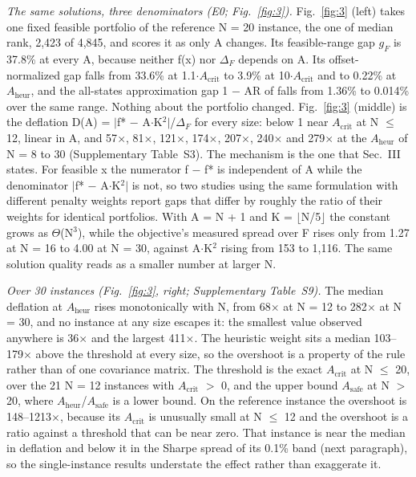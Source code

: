 \documentclass{ieeeaccess}
\begin{document}
\textit{The same solutions, three denominators (E0; Fig.~\ref{fig:3}).} Fig.~\ref{fig:3} (left) takes one fixed feasible portfolio of the reference N = 20 instance, the one of median rank, 2,423 of 4,845, and scores it as only A changes. Its feasible-range gap $g_{F}$ is 37.8\% at every A, because neither f(x) nor $\Delta_{F}$ depends on A. Its offset-normalized gap falls from 33.6\% at 1.1$\cdot$$A_{\mathrm{crit}}$ to 3.9\% at 10$\cdot$$A_{\mathrm{crit}}$ and to 0.22\% at $A_{\mathrm{heur}}$, and the all-states approximation gap 1 $-$ AR of \cite{ref22} falls from 1.36\% to 0.014\% over the same range. Nothing about the portfolio changed. Fig.~\ref{fig:3} (middle) is the deflation D(A) = $|$f* $-$ A$\cdot$K$^{2}$$|$/$\Delta_{F}$ for every size: below 1 near $A_{\mathrm{crit}}$ at N $\leq$ 12, linear in A, and 57$\times$, 81$\times$, 121$\times$, 174$\times$, 207$\times$, 240$\times$ and 279$\times$ at the $A_{\mathrm{heur}}$ of N = 8 to 30 (Supplementary Table~S3). The mechanism is the one that Sec.~III states. For feasible x the numerator f $-$ f* is independent of A while the denominator $|$f* $-$ A$\cdot$K$^{2}$$|$ is not, so two studies using the same formulation with different penalty weights report gaps that differ by roughly the ratio of their weights for identical portfolios. With A = N + 1 and K = $\lfloor$N/5$\rfloor$ the constant grows as $\Theta$(N$^{3}$), while the objective's measured spread over F rises only from 1.27 at N = 16 to 4.00 at N = 30, against A$\cdot$K$^{2}$ rising from 153 to 1,116. The same solution quality reads as a smaller number at larger N.


\textit{Over 30 instances (Fig.~\ref{fig:3}, right; Supplementary Table~S9).} The median deflation at $A_{\mathrm{heur}}$ rises monotonically with N, from 68$\times$ at N = 12 to 282$\times$ at N = 30, and no instance at any size escapes it: the smallest value observed anywhere is 36$\times$ and the largest 411$\times$. The heuristic weight sits a median 103--179$\times$ above the threshold at every size, so the overshoot is a property of the rule rather than of one covariance matrix. The threshold is the exact $A_{\mathrm{crit}}$ at N $\leq$ 20, over the 21 N = 12 instances with $A_{\mathrm{crit}}$ $>$ 0, and the upper bound $A_{\mathrm{safe}}$ at N $>$ 20, where $A_{\mathrm{heur}}$/$A_{\mathrm{safe}}$ is a lower bound. On the reference instance the overshoot is 148--1213$\times$, because its $A_{\mathrm{crit}}$ is unusually small at N $\leq$ 12 and the overshoot is a ratio against a threshold that can be near zero. That instance is near the median in deflation and below it in the Sharpe spread of its 0.1\% band (next paragraph), so the single-instance results understate the effect rather than exaggerate it.
\end{document}

